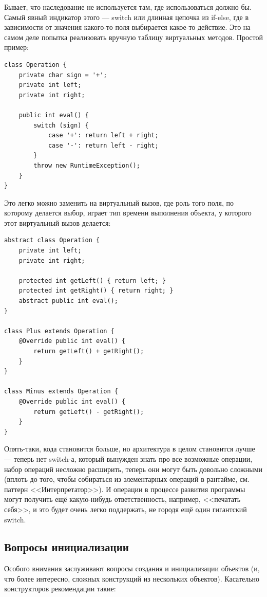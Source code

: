 \documentclass{../text-style}
\begin{document}
Бывает, что наследование не используется там, где использоваться должно бы. Самый явный индикатор этого --- switch или длинная цепочка из if-else, где в зависимости от значения какого-то поля выбирается какое-то действие. Это на самом деле попытка реализовать вручную таблицу виртуальных методов. Простой пример:

\begin{verbatim}
class Operation {
    private char sign = '+';
    private int left;
    private int right;

    public int eval() {
        switch (sign) {
            case '+': return left + right;
            case '-': return left - right;
        }
        throw new RuntimeException();
    }
}
\end{verbatim}

Это легко можно заменить на виртуальный вызов, где роль того поля, по которому делается выбор, играет тип времени выполнения объекта, у которого этот виртуальный вызов делается:

\begin{verbatim}
abstract class Operation {
    private int left;
    private int right;

    protected int getLeft() { return left; }
    protected int getRight() { return right; }
    abstract public int eval();
}

class Plus extends Operation {
    @Override public int eval() { 
        return getLeft() + getRight(); 
    }
}

class Minus extends Operation {
    @Override public int eval() { 
        return getLeft() - getRight(); 
    }
}
\end{verbatim}

Опять-таки, кода становится больше, но архитектура в целом становится лучше --- теперь нет switch-а, который вынужден знать про все возможные операции, набор операций несложно расширить, теперь они могут быть довольно сложными (вплоть до того, чтобы собираться из элементарных операций в рантайме, см. паттерн <<Интерпретатор>>). И операции в процессе развития программы могут получить ещё какую-нибудь ответственность, например, <<печатать себя>>, и это будет очень легко поддержать, не городя ещё один гигантский switch.

\subsection{Вопросы инициализации}

Особого внимания заслуживают вопросы создания и инициализации объектов (и, что более интересно, сложных конструкций из нескольких объектов). Касательно конструкторов рекомендации такие:
\end{document}

